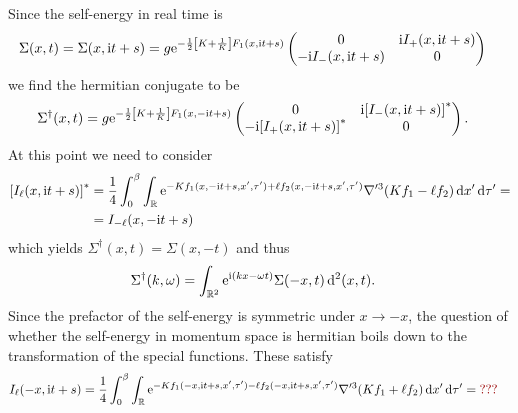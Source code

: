 \documentclass[english, parskip=full]{scrartcl}
\begin{document}
Since the self-energy in real time is
\begin{align}
\Sigma(x,t) &= \Sigma(x, \i t + s) = g\powe{-\frac{1}{2} \klb*{K + \frac{1}{K}} F_1(x,\i t + s)} \begin{pmatrix}
0 & \i I_+(x,\i t + s) \\ -\i I_-(x,\i t + s) & 0
\end{pmatrix}
\end{align}
we find the hermitian conjugate to be
\begin{align}
\Sigma^\dagger(x,t) &= g\powe{-\frac{1}{2} \klb*{K + \frac{1}{K}} F_1(x,-\i t + s)} \begin{pmatrix}
0 & \i \klb*{I_-(x,\i t + s)}^\ast \\ -\i \klb*{I_+(x,\i t + s)}^\ast & 0
\end{pmatrix}.
\end{align}
At this point we need to consider
\begin{align}
\klb*{I_\ell(x,\i t + s)}^\ast &= \frac{1}{4} \intx{0}{\beta}{\intr{\powe{-Kf_1(x,-\i t + s, x',\tau') + \ell f_2(x, -\i t + s,x',\tau')} \nabla'^3 \kla*{Kf_1 - \ell f_2} }{x'} }{\tau'} = \\
&= I_{-\ell}(x, -\i t + s)
\end{align}
which yields $\Sigma^\dagger(x,t) = \Sigma(x,-t)$ and thus
\begin{align}
\Sigma^\dagger(k,\omega) &= \intrnd{2}{\powe{\i (kx-\omega t)} \Sigma(-x, t) }{(x,t)}.
\end{align}
Since the prefactor of the self-energy is symmetric under $x\rightarrow -x$, the question of whether the self-energy in momentum space is hermitian boils down to the transformation of the special functions.
These satisfy
\begin{align}
I_\ell(-x,\i t + s) &= \frac{1}{4} \intx{0}{\beta}{\intr{\powe{-Kf_1(-x,\i t+s,x',\tau') - \ell f_2(-x,\i t+s,x',\tau')} \nabla'^3 \kla*{Kf_1 + \ell f_2}}{x'} }{\tau'} = \TODO{???}
\end{align}
\end{document}
